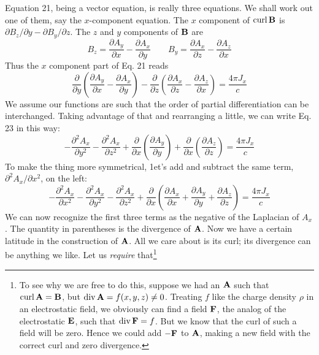 Equation 21, being a vector equation, is really three equations.
We shall work out one of them, say the $x$-component equation. The
$x$ component of $\operatorname{curl}\mathbf{B}$ is $\partial B_z/\partial y-\partial B_y/\partial z$.
The $z$ and $y$ components
of $\mathbf{B}$ are
\begin{equation}
  B_z = \frac{\partial A_y}{\partial x} - \frac{\partial A_x}{\partial y}
  \qquad
  B_y = \frac{\partial A_x}{\partial z} - \frac{\partial A_z}{\partial x}
\end{equation}
Thus the $x$ component part of Eq. 21 reads
\begin{equation}
  \frac{\partial}{\partial y} \left(\frac{\partial A_y}{\partial x} - \frac{\partial A_x}{\partial y}\right)
 -\frac{\partial}{\partial z} \left(\frac{\partial A_x}{\partial z} - \frac{\partial A_z}{\partial x}\right)
 = \frac{4\pi J_x}{c}
\end{equation}
We assume our functions are such that the order of partial differentiation
can be interchanged. Taking advantage of that and rearranging
a little, we can write Eq. 23 in this way:
\begin{equation}
  -\frac{\partial^2 A_x}{\partial y^2} - \frac{\partial^2 A_x}{\partial z^2}
  +\frac{\partial}{\partial x} \left(\frac{\partial A_y}{\partial y}\right)
  +\frac{\partial}{\partial x} \left(\frac{\partial A_z}{\partial z}\right)
 = \frac{4\pi J_x}{c}
\end{equation}
To make the thing more symmetrical, 1et's add and subtract the same
term, $\partial^2 A_x/\partial x^2$, on the left:
\begin{equation}
  -\frac{\partial^2 A_x}{\partial x^2}
  - \frac{\partial^2 A_x}{\partial y^2}
  - \frac{\partial^2 A_x}{\partial z^2}
  +\frac{\partial}{\partial x} \left(
    \frac{\partial A_x}{\partial x}
   +\frac{\partial A_y}{\partial y}
   +\frac{\partial A_z}{\partial z}
  \right)
 = \frac{4\pi J_x}{c}
\end{equation}
We can now recognize the first three terms as the negative of the
Laplacian of $A_x$. The quantity in parentheses is the divergence of $\mathbf{A}$.
Now we have a certain latitude in the construction of $\mathbf{A}$. All we care
about is its curl; its divergence can be anything we like. Let us
\emph{require} that\footnote{To see why we are free to do this,
suppose we had an $\mathbf{A}$ such that $\operatorname{curl}\mathbf{A}=\mathbf{B}$, but
$\operatorname{div} \mathbf{A} = f(x,y,z) \ne 0$. Treating $f$ like the charge density $\rho$ in an electrostatic field, we
obviously can find a field $\mathbf{F}$, the analog of the electrostatic $\mathbf{E}$, such that $\operatorname{div}\mathbf{F} = f$.
But we know that the curl of such a field will be zero. Hence we could add $-\mathbf{F}$ to $\mathbf{A}$,
making a new field with the correct curl and zero divergence.}
